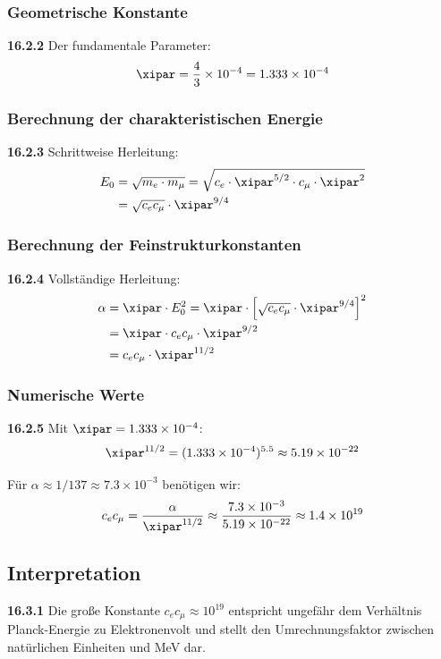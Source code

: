 \subsubsection{Geometrische Konstante}
\noindent \textbf{16.2.2} Der fundamentale Parameter:
\begin{equation}
	\xipar = \frac{4}{3} \times 10^{-4} = 1.333 \times 10^{-4}
\end{equation}

\subsubsection{Berechnung der charakteristischen Energie}
\noindent \textbf{16.2.3} Schrittweise Herleitung:
\begin{align}
	E_0 &= \sqrt{m_e \cdot m_\mu} = \sqrt{c_e \cdot \xipar^{5/2} \cdot c_\mu \cdot \xipar^2} \\
	&= \sqrt{c_e c_\mu} \cdot \xipar^{9/4}
\end{align}

\subsubsection{Berechnung der Feinstrukturkonstanten}
\noindent \textbf{16.2.4} Vollständige Herleitung:
\begin{align}
	\alpha &= \xipar \cdot E_0^2 = \xipar \cdot \left[ \sqrt{c_e c_\mu} \cdot \xipar^{9/4} \right]^2 \\
	&= \xipar \cdot c_e c_\mu \cdot \xipar^{9/2} \\
	&= c_e c_\mu \cdot \xipar^{11/2}
\end{align}

\subsubsection{Numerische Werte}
\noindent \textbf{16.2.5} Mit $\xipar = 1.333 \times 10^{-4}$:
\begin{equation}
	\xipar^{11/2} = (1.333 \times 10^{-4})^{5.5} \approx 5.19 \times 10^{-22}
\end{equation}

Für $\alpha \approx 1/137 \approx 7.3 \times 10^{-3}$ benötigen wir:
\begin{equation}
	c_e c_\mu = \frac{\alpha}{\xipar^{11/2}} \approx \frac{7.3 \times 10^{-3}}{5.19 \times 10^{-22}} \approx 1.4 \times 10^{19}
\end{equation}

\subsection{Interpretation}
\noindent \textbf{16.3.1} Die große Konstante $c_e c_\mu \approx 10^{19}$ entspricht ungefähr dem Verhältnis Planck-Energie zu Elektronenvolt und stellt den Umrechnungsfaktor zwischen natürlichen Einheiten und MeV dar.

